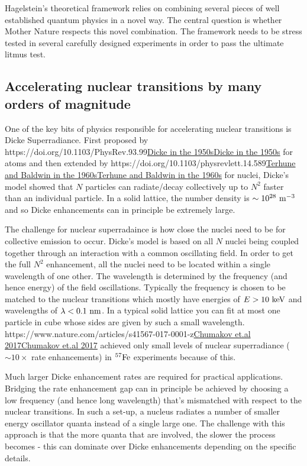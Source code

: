 \documentclass[
]{article}
\let\oldhref\href
\renewcommand{\href}[2]{\ifx#1\urlprefix\oldhref{#1}{#2}\else\uline{\oldhref{#1}{#2}}\fi}
\renewcommand{\[}{\begin{equation}}
\renewcommand{\]}{\end{equation}}
\begin{document}
Hagelstein's theoretical framework relies on combining several pieces of
well established quantum physics in a novel way. The central question is
whether Mother Nature respects this novel combination. The framework
needs to be stress tested in several carefully designed experiments in
order to pass the ultimate litmus test.

\subsection{Accelerating nuclear transitions by many orders of
magnitude}\label{accelerating-nuclear-transitions-by-many-orders-of-magnitude}

One of the key bits of physics responsible for accelerating nuclear
transitions is Dicke Superradiance. First proposed by
\href{https://doi.org/10.1103/PhysRev.93.99}{Dicke in the 1950s} for
atoms and then extended by
\href{https://doi.org/10.1103/physrevlett.14.589}{Terhune and Baldwin in
the 1960s} for nuclei, Dicke's model showed that \(N\) particles can
radiate/decay collectively up to \(N^2\) faster than an individual
particle. In a solid lattice, the number density is
\(\sim 10^{28} \ \rm m^{-3}\) and so Dicke enhancements can in principle
be extremely large.

The challenge for nuclear superradaince is how close the nuclei need to
be for collective emission to occur. Dicke's model is based on all \(N\)
nuclei being coupled together through an interaction with a common
oscillating field. In order to get the full \(N^2\) enhancement, all the
nuclei need to be located within a single wavelength of one other. The
wavelength is determined by the frequency (and hence energy) of the
field oscillations. Typically the frequency is chosen to be matched to
the nuclear transitions which mostly have energies of
\(E > 10 \ \rm keV\) and wavelengths of \(\lambda < 0.1 \ \rm nm\). In a
typical solid lattice you can fit at most one particle in cube whose
sides are given by such a small wavelength.
\href{https://www.nature.com/articles/s41567-017-0001-z}{Chumakov et.al
2017} achieved only small levels of nuclear superradiance
(\(\sim 10 \times\) rate enhancements) in \(\rm ^{57}Fe\) experiments
because of this.

Much larger Dicke enhancement rates are required for practical
applications. Bridging the rate enhancement gap can in principle be
achieved by choosing a low frequency (and hence long wavelength) that's
mismatched with respect to the nuclear transitions. In such a set-up, a
nucleus radiates a number of smaller energy oscillator quanta instead of
a single large one. The challenge with this approach is that the more
quanta that are involved, the slower the process becomes - this can
dominate over Dicke enhancements depending on the specific details.
\end{document}

